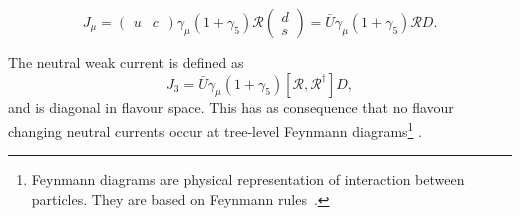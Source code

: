 \begin{equation}
J_{\mu} = \begin{pmatrix}
u & c
\end{pmatrix}  \gamma_{\mu}\left(1+\gamma_5\right)\mathcal{R}  \begin{pmatrix}
d \\ s
\end{pmatrix}
= \bar{U} \gamma_{\mu}\left(1+\gamma_5\right)\mathcal{R}D. 
\end{equation} 

The neutral weak current is defined as 
\begin{equation}
J_{3} = \bar{U} \gamma_{\mu}\left(1+\gamma_5\right)\left[\mathcal{R}, \mathcal{R}^{\dagger}\right]D, 
\end{equation} 
and is diagonal in flavour space. This has as consequence that no flavour changing neutral currents occur at tree-level Feynmann diagrams\footnote{Feynmann diagrams are physical representation of interaction between particles. They are based on Feynmann rules~\cite{Peskin:257493}.} .



